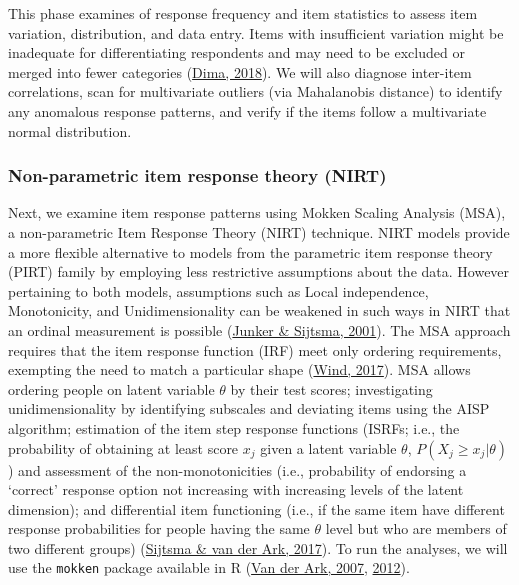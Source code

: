 \documentclass[
  ,doc,11pt, twoside,floatsintext]{apa6}
\begin{document}
This phase examines of response frequency and item statistics to assess item variation, distribution, and data entry. Items with insufficient variation might be inadequate for differentiating respondents and may need to be excluded or merged into fewer categories (\protect\hyperlink{ref-dima2018}{Dima, 2018}). We will also diagnose inter-item correlations, scan for multivariate outliers (via Mahalanobis distance) to identify any anomalous response patterns, and verify if the items follow a multivariate normal distribution.

\hypertarget{non-parametric-item-response-theory-nirt}{%
\subsubsection{Non-parametric item response theory (NIRT)}\label{non-parametric-item-response-theory-nirt}}

Next, we examine item response patterns using Mokken Scaling Analysis (MSA), a non-parametric Item Response Theory (NIRT) technique. NIRT models provide a more flexible alternative to models from the parametric item response theory (PIRT) family by employing less restrictive assumptions about the data. However pertaining to both models, assumptions such as Local independence, Monotonicity, and Unidimensionality can be weakened in such ways in NIRT that an ordinal measurement is possible (\protect\hyperlink{ref-junker2001}{Junker \& Sijtsma, 2001}). The MSA approach requires that the item response function (IRF) meet only ordering requirements, exempting the need to match a particular shape (\protect\hyperlink{ref-wind2017}{Wind, 2017}). MSA allows ordering people on latent variable \(\theta\) by their test scores; investigating unidimensionality by identifying subscales and deviating items using the AISP algorithm; estimation of the item step response functions (ISRFs; i.e., the probability of obtaining at least score \(x_j\) given a latent variable \(\theta\), \(P(X_j \ge x_j|\theta)\)) and assessment of the non-monotonicities (i.e., probability of endorsing a `correct' response option not increasing with increasing levels of the latent dimension); and differential item functioning (i.e., if the same item have different response probabilities for people having the same \(\theta\) level but who are members of two different groups) (\protect\hyperlink{ref-sijtsma2017}{Sijtsma \& van der Ark, 2017}). To run the analyses, we will use the \texttt{mokken} package available in R (\protect\hyperlink{ref-ark2007}{Van der Ark, 2007}, \protect\hyperlink{ref-ark2012}{2012}).
\end{document}
